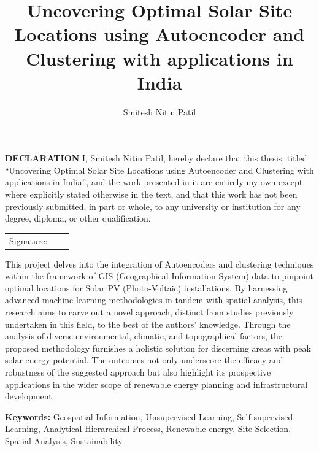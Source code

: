 \documentclass[a4paper,12pt]{Classes/RoboticsLaTeX}
\title{\Large{Uncovering Optimal Solar Site
Locations using Autoencoder and Clustering with applications in India}}
\author{Smitesh Nitin Patil}
\begin{document}
	\begin{spacing}{1}
		\maketitle
	\end{spacing}
	
	
	\setcounter{secnumdepth}{3}
	\setcounter{tocdepth}{3}
	
	\frontmatter
	
	\textbf{DECLARATION} 
	I, Smitesh Nitin Patil, hereby declare that this thesis, titled ``Uncovering Optimal Solar Site
	Locations using Autoencoder and Clustering with applications in India'', and the work presented in it are entirely my own except where explicitly stated otherwise in the text, and that this work has not been previously submitted, in part or whole, to any university or institution for any degree, diploma, or other qualification. 
	\newline
	
	\begin{tabular}{@{}p{.5in}p{4in}@{}}
		Signature: & ~~\hrulefill \\
	\end{tabular}
	
	
	
	
	\begin{abstracts}
		This project delves into the integration of Autoencoders and clustering techniques within the framework of GIS (Geographical Information System) 
		data to pinpoint optimal locations for Solar PV (Photo-Voltaic) installations. By harnessing advanced machine learning methodologies in tandem with 
		spatial analysis, this research aims to carve out a novel approach, distinct from studies previously undertaken in this field, to the best of the authors' 
		knowledge. Through the analysis of diverse environmental, climatic, and topographical factors, the proposed methodology furnishes a holistic solution for 
		discerning areas with peak solar energy potential. The outcomes not only underscore the efficacy and robustness of the suggested approach but also highlight 
		its prospective applications in the wider scope of renewable energy planning and infrastructural development.
		
		\textbf{Keywords: } Geospatial Information, Unsupervised Learning, Self-supervised
		Learning, Analytical-Hierarchical Process, Renewable energy, Site Selection,
		Spatial Analysis, Sustainability.
	\end{abstracts}
	
\end{document}
